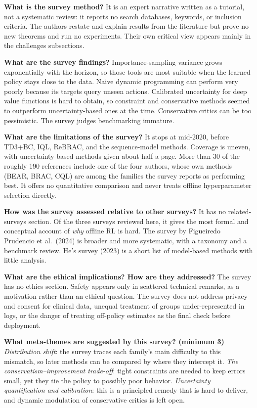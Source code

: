 \documentclass[11pt]{article}
\newcommand{\q}[2]{\item \textbf{#1} #2}
\begin{document}
\begin{qna}
\q{What is the survey method?}
It is an expert narrative written as a tutorial, not a systematic review: it reports no search databases, keywords, or inclusion criteria. The authors restate and explain results from the literature but prove no new theorems and run no experiments. Their own critical view appears mainly in the challenges subsections.

\q{What are the survey findings?}
Importance-sampling variance grows exponentially with the horizon, so those tools are most suitable when the learned policy stays close to the data. Naive dynamic programming can perform very poorly because its targets query unseen actions. Calibrated uncertainty for deep value functions is hard to obtain, so constraint and conservative methods seemed to outperform uncertainty-based ones at the time. Conservative critics can be too pessimistic. The survey judges benchmarking immature.

\q{What are the limitations of the survey?}
It stops at mid-2020, before TD3+BC, IQL, ReBRAC, and the sequence-model methods. Coverage is uneven, with uncertainty-based methods given about half a page. More than 30 of the roughly 190 references include one of the four authors, whose own methods (BEAR, BRAC, CQL) are among the families the survey reports as performing best. It offers no quantitative comparison and never treats offline hyperparameter selection directly.

\q{How was the survey assessed relative to other surveys?}
It has no related-surveys section. Of the three surveys reviewed here, it gives the most formal and conceptual account of \emph{why} offline RL is hard. The survey by Figueiredo Prudencio et al.\ (2024) is broader and more systematic, with a taxonomy and a benchmark review. He's survey (2023) is a short list of model-based methods with little analysis.

\q{What are the ethical implications? How are they addressed?}
The survey has no ethics section. Safety appears only in scattered technical remarks, as a motivation rather than an ethical question. The survey does not address privacy and consent for clinical data, unequal treatment of groups under-represented in logs, or the danger of treating off-policy estimates as the final check before deployment.

\q{What meta-themes are suggested by this survey? (minimum 3)}
\emph{Distribution shift}: the survey traces each family's main difficulty to this mismatch, so later methods can be compared by where they intercept it. \emph{The conservatism--improvement trade-off}: tight constraints are needed to keep errors small, yet they tie the policy to possibly poor behavior. \emph{Uncertainty quantification and calibration}: this is a principled remedy that is hard to deliver, and dynamic modulation of conservative critics is left open.

\end{qna}
\end{document}
